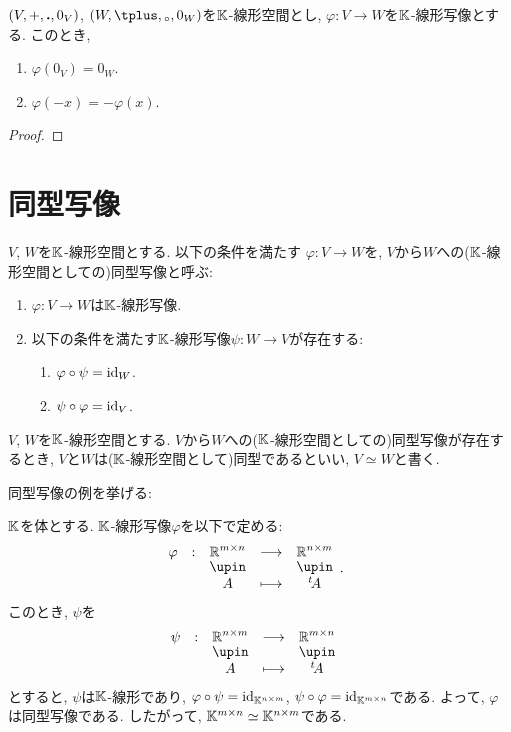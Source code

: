 \begin{prop}
  $(V,+,\mathbin{\boldsymbol{.}},0_V)$, $(W,\pplus,\aact,0_W)$を$\mathbb{K}$-線形空間とし,
  $\varphi\colon V\to W$を$\mathbb{K}$-線形写像とする.
  このとき,
  \begin{enumerate}
    \item $\varphi(0_V)=0_W$.
    \item $\varphi(-x)=-\varphi(x)$.
  \end{enumerate}
\end{prop}
\begin{proof}\end{proof}


\section{同型写像}

\begin{definition}
  $V$, $W$を$\mathbb{K}$-線形空間とする.
  以下の条件を満たす
  $\varphi\colon V\to W$を,
  $V$から$W$への($\mathbb{K}$-線形空間としての)同型写像と呼ぶ:
  \begin{enumerate}
  \item $\varphi\colon V\to W$は$\mathbb{K}$-線形写像.
  \item 以下の条件を満たす$\mathbb{K}$-線形写像$\psi\colon W \to V$が存在する:
    \begin{enumerate}
      \item $\varphi\circ \psi=\operatorname{id}_W$.
      \item $\psi\circ \varphi=\operatorname{id}_V$.
    \end{enumerate}
  \end{enumerate}
\end{definition}
\begin{definition}
  $V$, $W$を$\mathbb{K}$-線形空間とする.
  $V$から$W$への($\mathbb{K}$-線形空間としての)同型写像が存在するとき,
  $V$と$W$は($\mathbb{K}$-線形空間として)同型であるといい,  
  $V\simeq W$と書く.
\end{definition}

同型写像の例を挙げる:
\begin{example}
  $\mathbb{K}$を体とする.
  $\mathbb{K}$-線形写像$\varphi$を以下で定める:
  \begin{align*}
    &\shazo{\varphi}{\RR^{m\times n}}{\RR^{n\times m}}{A}{\transposed{A}}.
  \end{align*}
  このとき,
  $\psi$を
  \begin{align*}
    &\shazo{\psi}{\RR^{n\times m}}{\RR^{m\times n}}{A}{\transposed{A}}
  \end{align*}
  とすると,
  $\psi$は$\mathbb{K}$-線形であり, $\varphi\circ \psi=\operatorname{id}_{\mathbb{K}^{n\times m}}$, $\psi\circ\varphi=\operatorname{id}_{\mathbb{K}^{m\times n}}$である.
  よって, $\varphi$は同型写像である.
  したがって, $\mathbb{K}^{m\times n}\simeq\mathbb{K}^{n\times m}$である.
\end{example}


